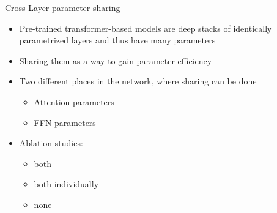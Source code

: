 
\begin{frame}{Cross-Layer parameter sharing}

\vfill

	\begin{itemize}
		\item Pre-trained transformer-based models are deep stacks of identically parametrized layers and thus have many parameters
		\item Sharing them as a way to gain parameter efficiency
		\item Two different places in the network, where sharing can be done
			\begin{itemize}
				\item Attention parameters
				\item FFN parameters
			\end{itemize}
		\item Ablation studies: 
			\begin{itemize}
				\item both
				\item both individually
				\item none
			\end{itemize}
	\end{itemize}

\vfill

\end{frame}


